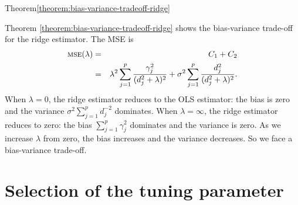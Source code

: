 \begin{myproof}{Theorem}{\ref{theorem:bias-variance-tradeoff-ridge}}
%
%
\end{myproof}



Theorem \ref{theorem:bias-variance-tradeoff-ridge} shows the bias-variance trade-off for the ridge estimator. The MSE is 
\begin{eqnarray*}
\textsc{mse}(\lambda) &=& C_{1}+C_{2} \\
&=& \lambda^{2}\sum_{j=1}^{p}\frac{\gamma_{j}^{2}}{( d_j^2 +\lambda)^{2}}+\sigma^{2}\sum_{j=1}^{p}\frac{ d_j^2 }{( d_j^2 +\lambda)^{2}}.
\end{eqnarray*}
When $\lambda=0$, the ridge estimator reduces to the OLS estimator:
the bias is zero and the variance $\sigma^{2}\sum_{j=1}^{p} d_j^{-2}$
dominates. When $\lambda=\infty$, the ridge estimator reduces to
zero: the bias $\sum_{j=1}^{p}\gamma_{j}^{2}$ dominates and the variance
is zero. As we increase $\lambda$ from zero, the bias increases and
the variance decreases. So we face a bias-variance trade-off. 





\section{Selection of the tuning parameter}


